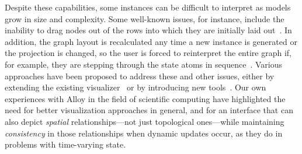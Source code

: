 \documentclass[runningheads]{llncs}
\begin{document}
Despite these capabilities, some instances can be difficult to interpret as models grow in size and complexity.
Some well-known issues, for instance, include the inability to drag nodes out of the rows into which they are initially laid out~\cite{couto2018,macedo2019}.
In addition, the graph layout is recalculated any time a new instance is generated or the projection is changed, so the user is forced to reinterpret the entire graph if, for example, they are stepping through the state atoms in sequence~\cite{couto2018,misue1995,zaman2013}.
Various approaches have been proposed to address these and other issues, either by extending the existing visualizer~\cite{zaman2013} or by introducing new tools~\cite{couto2018,macedo2019,gammaitoni2014}.
%
%
Our own experiences with Alloy in the field of scientific computing have highlighted the need for better visualization approaches in general, and for an interface that can also depict \emph{spatial} relationships---not just topological ones---while maintaining \emph{consistency} in those relationships when dynamic updates occur, as they do in problems with time-varying state.
\end{document}

